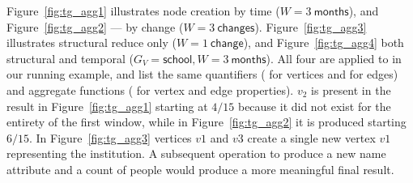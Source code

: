 Figure~\ref{fig:tg_agg1} illustrates node creation by time
($W=3~\textsf{months}$), and Figure~\ref{fig:tg_agg2} --- by change
($W=3~\textsf{changes}$).  Figure~\ref{fig:tg_agg3} illustrates
structural reduce only ($W=1~\textsf{change}$), and
Figure~\ref{fig:tg_agg4} both structural and temporal
($G_V=\textsf{school}, W=3~\textsf{months}$).  All four are applied to
 in our running example, and list the same quantifiers
( for vertices and  for edges) and aggregate
functions ( for vertex and edge properties).  $v_2$ is
present in the result in Figure~\ref{fig:tg_agg1} starting at $4/15$
because it did not exist for the entirety of the first window, while
in Figure~\ref{fig:tg_agg2} it is produced starting $6/15$.  In
Figure~\ref{fig:tg_agg3} vertices $v1$ and $v3$ create a single new
vertex $v1$ representing the institution.  A subsequent 
operation to produce a new name attribute and a count of people would
produce a more meaningful final result.

